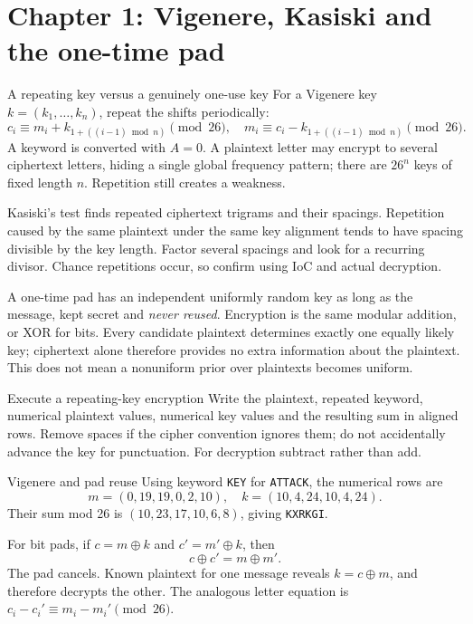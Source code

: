 \documentclass[11pt,a4paper]{article}
\begin{document}
\section{Chapter 1: Vigenere, Kasiski and the one-time pad}
\begin{concept}{A repeating key versus a genuinely one-use key}
For a Vigenere key \(k=(k_1,\ldots,k_n)\), repeat the shifts periodically:
\[c_i\equiv m_i+k_{1+((i-1)\bmod n)}\pmod{26},\quad m_i\equiv c_i-k_{1+((i-1)\bmod n)}\pmod{26}.\]
A keyword is converted with \(A=0\). A plaintext letter may encrypt to several ciphertext letters, hiding a single global frequency pattern; there are \(26^n\) keys of fixed length \(n\). Repetition still creates a weakness.

Kasiski's test finds repeated ciphertext trigrams and their spacings. Repetition caused by the same plaintext under the same key alignment tends to have spacing divisible by the key length. Factor several spacings and look for a recurring divisor. Chance repetitions occur, so confirm using IoC and actual decryption.

A one-time pad has an independent uniformly random key as long as the message, kept secret and \emph{never reused}. Encryption is the same modular addition, or XOR for bits. Every candidate plaintext determines exactly one equally likely key; ciphertext alone therefore provides no extra information about the plaintext. This does not mean a nonuniform prior over plaintexts becomes uniform.
\end{concept}
\begin{method}{Execute a repeating-key encryption}
Write the plaintext, repeated keyword, numerical plaintext values, numerical key values and the resulting sum in aligned rows. Remove spaces if the cipher convention ignores them; do not accidentally advance the key for punctuation. For decryption subtract rather than add.
\end{method}
\begin{example}{Vigenere and pad reuse}
Using keyword \texttt{KEY} for \texttt{ATTACK}, the numerical rows are
\[m=(0,19,19,0,2,10),\quad k=(10,4,24,10,4,24).\]
Their sum mod 26 is \((10,23,17,10,6,8)\), giving \texttt{KXRKGI}.

For bit pads, if \(c=m\oplus k\) and \(c'=m'\oplus k\), then
\[c\oplus c'=m\oplus m'.\]
The pad cancels. Known plaintext for one message reveals \(k=c\oplus m\), and therefore decrypts the other. The analogous letter equation is \(c_i-c_i'\equiv m_i-m_i'\pmod{26}\).
\end{example}
\end{document}
